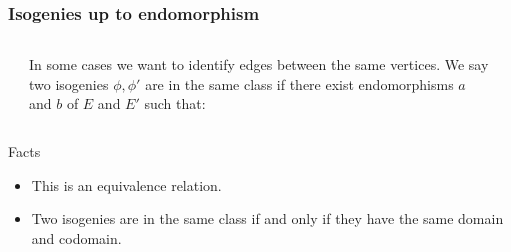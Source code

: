 \documentclass{beamer}
\renewcommand{\emph}[1]{{\usebeamercolor[fg]{structure}#1}}
\begin{document}
\begin{frame}
  \frametitle{Isogenies up to endomorphism}

  \begin{columns}
    \begin{column}{0.2\textwidth}
      \begin{center}
      \end{center}
    \end{column}
    \begin{column}{0.6\textwidth}
      In some cases we want to identify edges between the same
      vertices. We say two \alert{isogenies} $\phi,\phi'$ are
      \alert{in the same class} if there exist endomorphisms $a$ and
      $b$ of $E$ and $E'$ such that:
    \end{column}
    \begin{column}{0.2\textwidth}
      \begin{center}
      \end{center}
    \end{column}
  \end{columns}

  \begin{block}{Facts}
    \begin{itemize}
    \item This is an equivalence relation.
    \item Two isogenies are in the same class \alert{if and only if}
      they have the \emph{same domain and codomain}.
    \end{itemize}
  \end{block}
\end{frame}
\end{document}
